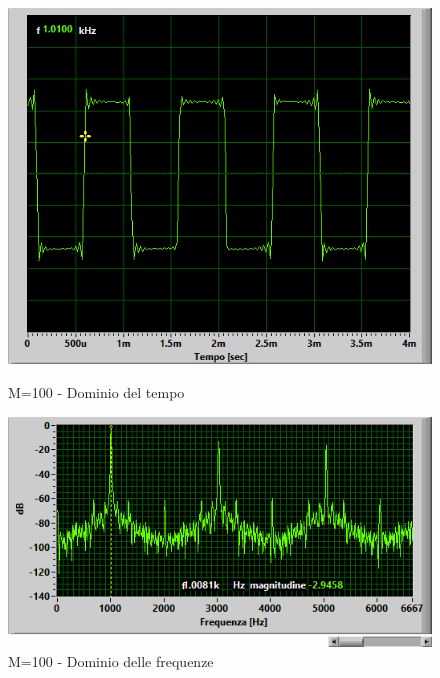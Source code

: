\documentclass[a4paper]{article}
\begin{document}
\begin{figure}[H]
   \begin{minipage}{0.48\textwidth}
     \centering
     \includegraphics[width=1\linewidth]{m100}
     \caption{M=100 - Dominio del tempo}\label{Fig:Data1}
   \end{minipage}\hfill
   \begin{minipage}{0.48\textwidth}
     \centering
     \includegraphics[width=1\linewidth]{m100f}
     \caption{M=100 - Dominio delle frequenze}\label{Fig:Data2}
   \end{minipage}
\end{figure}
\end{document}
